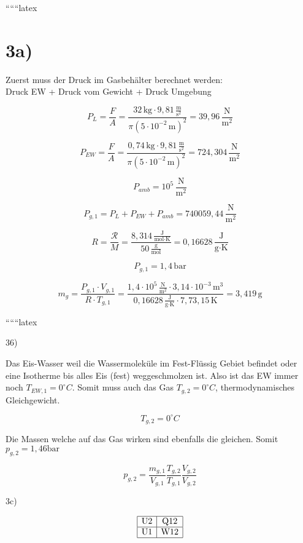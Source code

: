 
``````latex


\section*{3a)}

Zuerst muss der Druck im Gasbehälter berechnet werden: \\
Druck EW + Druck vom Gewicht + Druck Umgebung

\[
P_L = \frac{F}{A} = \frac{32 \, \text{kg} \cdot 9,81 \, \frac{\text{m}}{\text{s}^2}}{\pi \left(5 \cdot 10^{-2} \, \text{m}\right)^2} = 39,96 \, \frac{\text{N}}{\text{m}^2}
\]

\[
P_{EW} = \frac{F}{A} = \frac{0,74 \, \text{kg} \cdot 9,81 \, \frac{\text{m}}{\text{s}^2}}{\pi \left(5 \cdot 10^{-2} \, \text{m}\right)^2} = 724,304 \, \frac{\text{N}}{\text{m}^2}
\]

\[
P_{amb} = 10^5 \, \frac{\text{N}}{\text{m}^2}
\]

\[
P_{g,1} = P_L + P_{EW} + P_{amb} = 740059,44 \, \frac{\text{N}}{\text{m}^2}
\]

\[
R = \frac{\mathcal{R}}{M} = \frac{8,314 \, \frac{\text{J}}{\text{mol} \cdot \text{K}}}{50 \, \frac{\text{g}}{\text{mol}}} = 0,16628 \, \frac{\text{J}}{\text{g} \cdot \text{K}}
\]

\[
P_{g,1} = 1,4 \, \text{bar}
\]

\[
m_g = \frac{P_{g,1} \cdot V_{g,1}}{R \cdot T_{g,1}} = \frac{1,4 \cdot 10^5 \, \frac{\text{N}}{\text{m}^2} \cdot 3,14 \cdot 10^{-3} \, \text{m}^3}{0,16628 \, \frac{\text{J}}{\text{g} \cdot \text{K}} \cdot 7,73,15 \, \text{K}} = 3,419 \, \text{g}
\]

``````latex


36)

Das Eis-Wasser weil die Wassermoleküle im Fest-Flüssig Gebiet befindet oder eine Isotherme bis alles Eis (fest) weggeschmolzen ist. Also ist das EW immer noch $T_{EW,1} = 0^\circ C$. Somit muss auch das Gas $T_{g,2} = 0^\circ C$, thermodynamisches Gleichgewicht.

\[
T_{g,2} = 0^\circ C
\]

Die Massen welche auf das Gas wirken sind ebenfalls die gleichen. Somit $p_{g,2} = 1,46 \text{bar}$

\[
p_{g,2} = \frac{m_{g,1}}{V_{g,1}} \frac{T_{g,2}}{T_{g,1}} \frac{V_{g,2}}{V_{g,2}}
\]

3c)

\[
\begin{array}{|c|c|}
\hline
\text{U2} & \text{Q12} \\
\hline
\text{U1} & \text{W12} \\
\hline
\end{array}
\]

